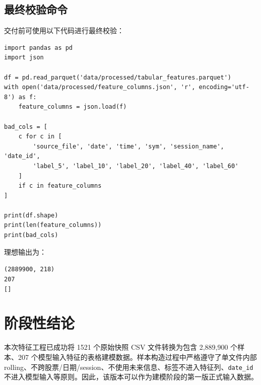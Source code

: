 \documentclass[UTF8,a4paper,12pt]{ctexart}
\begin{document}
\subsection{最终校验命令}

交付前可使用以下代码进行最终校验：

\begin{lstlisting}
import pandas as pd
import json

df = pd.read_parquet('data/processed/tabular_features.parquet')
with open('data/processed/feature_columns.json', 'r', encoding='utf-8') as f:
    feature_columns = json.load(f)

bad_cols = [
    c for c in [
        'source_file', 'date', 'time', 'sym', 'session_name', 'date_id',
        'label_5', 'label_10', 'label_20', 'label_40', 'label_60'
    ]
    if c in feature_columns
]

print(df.shape)
print(len(feature_columns))
print(bad_cols)
\end{lstlisting}

理想输出为：

\begin{center}
\texttt{(2889900, 218)}\\
\texttt{207}\\
\texttt{[]}
\end{center}

\section{阶段性结论}

本次特征工程已成功将 1521 个原始快照 CSV 文件转换为包含 2,889,900 个样本、207 个模型输入特征的表格建模数据。样本构造过程中严格遵守了单文件内部 rolling、不跨股票/日期/session、不使用未来信息、标签不进入特征列、\texttt{date\_id} 不进入模型输入等原则。因此，该版本可以作为建模阶段的第一版正式输入数据。
\end{document}
